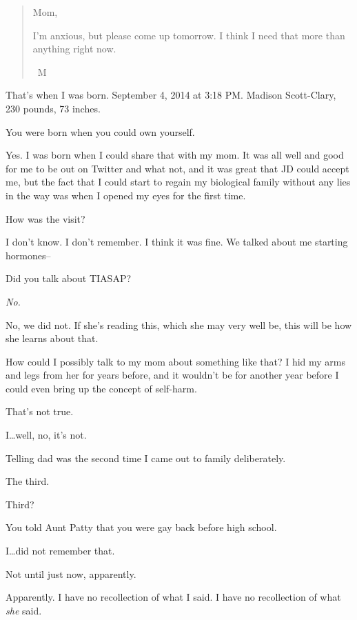 \begin{paracol}{2}
\begin{leftcolumn}
\begin{quotation}
Mom,

I'm anxious, but please come up tomorrow. I think I need that more than anything right now.

~M
\end{quotation}
That's when I was born. September 4, 2014 at 3:18 PM. Madison Scott-Clary, 230 pounds, 73 inches.

\begin{ally}
You were born when you could own yourself.
\end{ally}
Yes. I was born when I could share that with my mom. It was all well and good for me to be out on Twitter and what not, and it was great that JD could accept me, but the fact that I could start to regain my biological family without any lies in the way was when I opened my eyes for the first time.

\begin{ally}
How was the visit?
\end{ally}
I don't know. I don't remember. I think it was fine. We talked about me starting hormones--

\begin{ally}
Did you talk about TIASAP?
\end{ally}
\emph{No.}

No, we did not. If she's reading this, which she may very well be, this will be how she learns about that.

How could I possibly talk to my mom about something like that? I hid my arms and legs from her for years before, and it wouldn't be for another year before I could even bring up the concept of self-harm.

\begin{ally}
That's not true.
\end{ally}
I\ldots{}well, no, it's not.
\newpage

\noindent Telling dad was the second time I came out to family deliberately.

\begin{ally}
The third.
\end{ally}
Third?

\begin{ally}
You told Aunt Patty that you were gay back before high school.
\end{ally}
I\ldots{}did not remember that.

\begin{ally}
Not until just now, apparently.
\end{ally}
Apparently. I have no recollection of what I said. I have no recollection of what \emph{she} said.


\end{leftcolumn}
\end{paracol}
